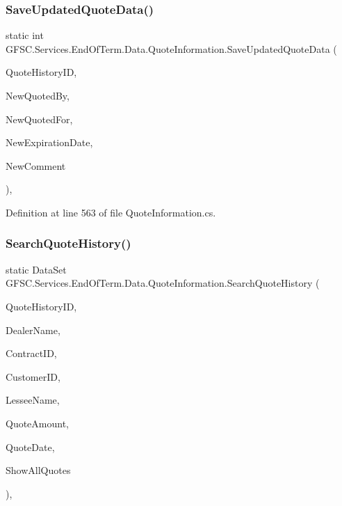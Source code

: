 \subsubsection{\texorpdfstring{Save\+Updated\+Quote\+Data()}{SaveUpdatedQuoteData()}}
{\footnotesize\ttfamily static int G\+F\+S\+C.\+Services.\+End\+Of\+Term.\+Data.\+Quote\+Information.\+Save\+Updated\+Quote\+Data (\begin{DoxyParamCaption}\item[{int}]{Quote\+History\+ID,  }\item[{string}]{New\+Quoted\+By,  }\item[{string}]{New\+Quoted\+For,  }\item[{Date\+Time}]{New\+Expiration\+Date,  }\item[{string}]{New\+Comment }\end{DoxyParamCaption})\hspace{0.3cm}{\ttfamily [static]}, {\ttfamily [package]}}



Definition at line 563 of file Quote\+Information.\+cs.

\mbox{\label{class_g_f_s_c_1_1_services_1_1_end_of_term_1_1_data_1_1_quote_information_a3de8655f1cf1d8a6fe724955f29586e1}} 
\subsubsection{\texorpdfstring{Search\+Quote\+History()}{SearchQuoteHistory()}}
{\footnotesize\ttfamily static Data\+Set G\+F\+S\+C.\+Services.\+End\+Of\+Term.\+Data.\+Quote\+Information.\+Search\+Quote\+History (\begin{DoxyParamCaption}\item[{string}]{Quote\+History\+ID,  }\item[{string}]{Dealer\+Name,  }\item[{string}]{Contract\+ID,  }\item[{string}]{Customer\+ID,  }\item[{string}]{Lessee\+Name,  }\item[{string}]{Quote\+Amount,  }\item[{string}]{Quote\+Date,  }\item[{bool}]{Show\+All\+Quotes }\end{DoxyParamCaption})\hspace{0.3cm}{\ttfamily [static]}, {\ttfamily [package]}}



